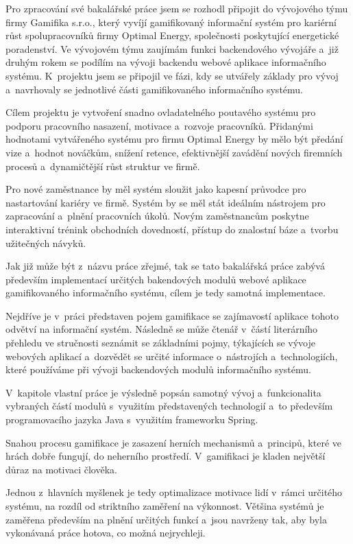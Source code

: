 \documentclass[twoside, 12pt]{article}
\begin{document}

Pro zpracování své bakalářské práce
jsem se rozhodl připojit do vývojového týmu firmy Gamifika s.r.o.,
který vyvíjí gamifikovaný informační systém
pro kariérní růst spolupracovníků firmy Optimal Energy,
společnosti poskytující energetické poradenství.
Ve vývojovém týmu zaujímám funkci backendového vývojáře
a~již druhým rokem se podílím na vývoji backendu webové aplikace informačního systému.
K~projektu jsem se připojil ve fázi, kdy se utvářely základy pro vývoj
a~navrhovaly se jednotlivé části gamifikovaného informačního systému.


Cílem projektu je vytvoření snadno ovladatelného poutavého systému
pro podporu pracovního nasazení, motivace a~rozvoje pracovníků.
Přidanými hodnotami vytvářeného systému pro firmu Optimal Energy
by mělo být předání vize a~hodnot nováčkům, snížení retence,
efektivnější zavádění nových firemních procesů
a~dynamičtější růst struktur ve firmě.


Pro nové zaměstnance by měl systém sloužit
jako kapesní průvodce pro nastartování kariéry ve firmě.
Systém by se měl stát ideálním nástrojem pro zapracování
a~plnění pracovních úkolů.
Novým zaměstnancům poskytne interaktivní trénink obchodních dovedností,
přístup do znalostní báze a~tvorbu užitečných návyků.


Jak již může být z~názvu práce zřejmé, tak se tato bakalářská práce
zabývá především implementací určitých bakendových modulů webové aplikace
gamifikovaného informačního systému, cílem je tedy samotná implementace.


Nejdříve je v~práci představen pojem gamifikace se
zajímavostí aplikace tohoto odvětví na informační systém.
Následně se může čtenář v~částí literárního přehledu
ve stručnosti seznámit se základními pojmy,
týkajících se vývoje webových aplikací a~dozvědět se určité informace o~nástrojích a~technologiích,
které používáme při vývoji backendových modulů informačního systému.

V~kapitole vlastní práce je výsledně popsán samotný vývoj a~funkcionalita
vybraných částí modulů s~využitím představených technologií
a~to především programovacího jazyka Java s~využitím frameworku Spring.



Snahou procesu gamifikace je zasazení herních mechanismů a~principů,
které ve hrách dobře fungují, do neherního prostředí.
V~gamifikaci je kladen největší důraz na motivaci člověka.

Jednou z~hlavních myšlenek je tedy optimalizace motivace lidí
v~rámci určitého systému, na rozdíl od striktního zaměření na výkonnost.
Většina systémů je zaměřena především na plnění určitých funkcí
a~jsou navrženy tak, aby byla vykonávaná práce hotova, co možná nejrychleji.
\end{document}
